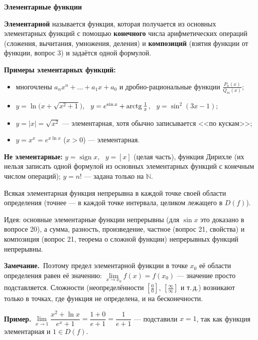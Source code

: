 \documentclass[a4paper,11pt]{article}
\newcommand{\N}{\mathbb{N}}
\newcommand{\zam}{\par\smallskip\noindent\textbf{\textcolor{zamc}{Замечание.}}\ }
\newcommand{\podr}[1]{\par\needspace{8\baselineskip}\medskip
  {\large\bfseries\textcolor{oprc!80!black}{#1}}\par\nopagebreak\smallskip}
\begin{document}
\podr{Элементарные функции}

\begin{opr}
\textbf{Элементарной} называется функция, которая получается из основных элементарных функций с помощью
\textbf{конечного} числа арифметических операций (сложения, вычитания, умножения, деления) и \textbf{композиций}
(взятия функции от функции, вопрос 3) и задаётся одной формулой.
\end{opr}

\textbf{Примеры элементарных функций:}
\begin{itemize}[leftmargin=*]
  \item многочлены $a_n x^n + \dots + a_1 x + a_0$ и дробно-рациональные функции $\frac{P_n(x)}{Q_m(x)}$;
  \item $y = \ln\bigl(x + \sqrt{x^2 + 1}\bigr)$, \ $y = e^{\sin x} + \operatorname{arctg}\frac1x$, \ $y = \sin^2(3x - 1)$;
  \item $y = |x| = \sqrt{x^2}$ --- элементарная, хотя обычно записывается <<по кускам>>;
  \item $y = x^x = e^{x \ln x}$ ($x > 0$) --- элементарная.
\end{itemize}

\textbf{Не элементарные:} $y = \operatorname{sign} x$, \ $y = [x]$ (целая часть), функция Дирихле
(их нельзя записать одной формулой из основных элементарных функций с конечным числом операций);
$y = n!$ --- задана только на $\N$.

\begin{teo}
Всякая элементарная функция непрерывна в каждой точке своей области определения
(точнее --- в каждой точке интервала, целиком лежащего в $D(f)$).
\end{teo}
Идея: основные элементарные функции непрерывны (для $\sin x$ это доказано в вопросе 20), а сумма, разность, произведение,
частное (вопрос 21, свойства) и композиция (вопрос 21, теорема о сложной функции) непрерывных функций непрерывны.

\zam Поэтому предел элементарной функции в точке $x_0$ её области определения равен её значению:
$\lim\limits_{x \to x_0} f(x) = f(x_0)$ --- значение просто подставляется. Сложности (неопределённости $\left[\frac00\right]$,
$\left[\frac\infty\infty\right]$ и т.\,д.) возникают только в точках, где функция не определена, и на бесконечности.

\textbf{Пример.} $\lim\limits_{x \to 1} \dfrac{x^2 + \ln x}{e^x + 1} = \dfrac{1 + 0}{e + 1} = \dfrac{1}{e + 1}$ --- подставили $x = 1$,
так как функция элементарная и $1 \in D(f)$.
\end{document}
